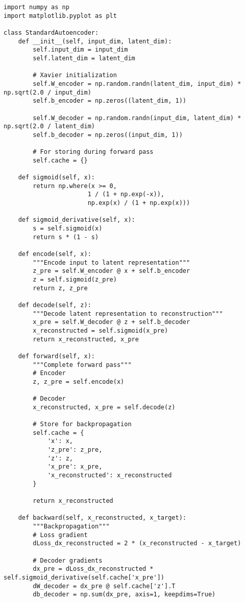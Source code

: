 ﻿\documentclass[12pt,a4paper]{article}
\begin{document}
\begin{lstlisting}
import numpy as np
import matplotlib.pyplot as plt

class StandardAutoencoder:
    def __init__(self, input_dim, latent_dim):
        self.input_dim = input_dim
        self.latent_dim = latent_dim
        
        # Xavier initialization
        self.W_encoder = np.random.randn(latent_dim, input_dim) * np.sqrt(2.0 / input_dim)
        self.b_encoder = np.zeros((latent_dim, 1))
        
        self.W_decoder = np.random.randn(input_dim, latent_dim) * np.sqrt(2.0 / latent_dim)
        self.b_decoder = np.zeros((input_dim, 1))
        
        # For storing during forward pass
        self.cache = {}
    
    def sigmoid(self, x):
        return np.where(x >= 0,
                       1 / (1 + np.exp(-x)),
                       np.exp(x) / (1 + np.exp(x)))
    
    def sigmoid_derivative(self, x):
        s = self.sigmoid(x)
        return s * (1 - s)
    
    def encode(self, x):
        """Encode input to latent representation"""
        z_pre = self.W_encoder @ x + self.b_encoder
        z = self.sigmoid(z_pre)
        return z, z_pre
    
    def decode(self, z):
        """Decode latent representation to reconstruction"""
        x_pre = self.W_decoder @ z + self.b_decoder
        x_reconstructed = self.sigmoid(x_pre)
        return x_reconstructed, x_pre
    
    def forward(self, x):
        """Complete forward pass"""
        # Encoder
        z, z_pre = self.encode(x)
        
        # Decoder
        x_reconstructed, x_pre = self.decode(z)
        
        # Store for backpropagation
        self.cache = {
            'x': x,
            'z_pre': z_pre,
            'z': z,
            'x_pre': x_pre,
            'x_reconstructed': x_reconstructed
        }
        
        return x_reconstructed
    
    def backward(self, x_reconstructed, x_target):
        """Backpropagation"""
        # Loss gradient
        dLoss_dx_reconstructed = 2 * (x_reconstructed - x_target)
        
        # Decoder gradients
        dx_pre = dLoss_dx_reconstructed * self.sigmoid_derivative(self.cache['x_pre'])
        dW_decoder = dx_pre @ self.cache['z'].T
        db_decoder = np.sum(dx_pre, axis=1, keepdims=True)
        

\end{lstlisting}
\end{document}
